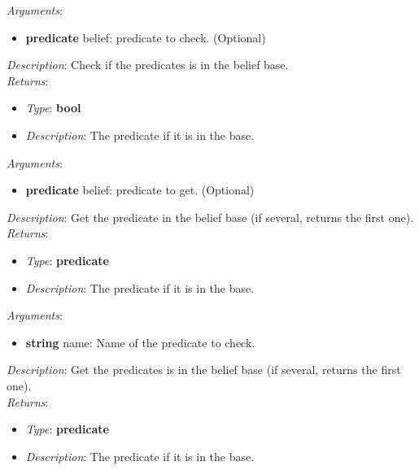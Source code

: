 \documentclass[a4paper]{article}
\newenvironment{blueblock}[1]{%
    \tcolorbox[beamer,%
    noparskip,breakable,
    colback=LightBlue,colframe=DarkBlue,%
    colbacklower=DarkBlue!75!LightBlue,%
    title=#1]}%
    {\endtcolorbox}
\begin{document}
            \begin{blueblock}{has\_belief(belief)}
                \textit{Arguments}:
                \begin{itemize}
                    \item \textbf{predicate} belief: predicate to check. (Optional)
                \end{itemize}
                \textit{Description}: Check if the predicates is in the belief base.\\
                \textit{Returns}:
                \begin{itemize}
                    \item \textit{Type}: \textbf{bool}
                    \item \textit{Description}: The predicate if it is in the base.
                \end{itemize}
            \end{blueblock}

            \begin{blueblock}{get\_belief(belief)}
                \textit{Arguments}:
                \begin{itemize}
                    \item \textbf{predicate} belief: predicate to get. (Optional)
                \end{itemize}
                \textit{Description}: Get the predicate in the belief base (if several, returns the first one).\\
                \textit{Returns}:
                \begin{itemize}
                    \item \textit{Type}: \textbf{predicate}
                    \item \textit{Description}: The predicate if it is in the base.
                \end{itemize}
            \end{blueblock}

            \begin{blueblock}{get\_belief\_with\_name(name)}
                \textit{Arguments}:
                \begin{itemize}
                    \item \textbf{string} name: Name of the predicate to check.
                \end{itemize}
                \textit{Description}: Get the predicates is in the belief base (if several, returns the first one).\\
                \textit{Returns}:
                \begin{itemize}
                    \item \textit{Type}: \textbf{predicate}
                    \item \textit{Description}: The predicate if it is in the base.
                \end{itemize}
            \end{blueblock}
\end{document}
